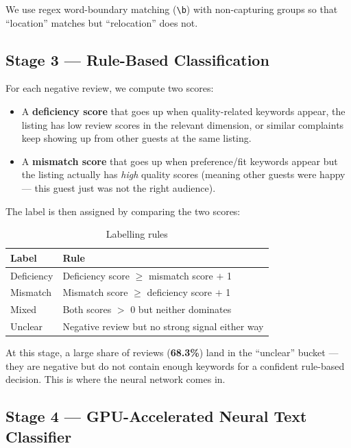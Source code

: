\documentclass[12pt,a4paper]{article}
\begin{document}
We use regex word-boundary matching (\verb|\b|) with non-capturing groups so that ``location'' matches but ``relocation'' does not.

\subsection{Stage 3 --- Rule-Based Classification}

For each negative review, we compute two scores:

\begin{itemize}[nosep]
    \item A \textbf{deficiency score} that goes up when quality-related keywords appear, the listing has low review scores in the relevant dimension, or similar complaints keep showing up from other guests at the same listing.
    \item A \textbf{mismatch score} that goes up when preference/fit keywords appear but the listing actually has \emph{high} quality scores (meaning other guests were happy --- this guest just was not the right audience).
\end{itemize}

The label is then assigned by comparing the two scores:

\begin{table}[H]
\centering
\caption{Labelling rules}
\begin{tabular}{lp{9cm}}
\toprule
\textbf{Label} & \textbf{Rule} \\
\midrule
Deficiency & Deficiency score $\geq$ mismatch score $+$ 1 \\
Mismatch   & Mismatch score $\geq$ deficiency score $+$ 1 \\
Mixed      & Both scores $>$ 0 but neither dominates \\
Unclear    & Negative review but no strong signal either way \\
\bottomrule
\end{tabular}
\end{table}

At this stage, a large share of reviews (\textbf{68.3\%}) land in the ``unclear'' bucket --- they are negative but do not contain enough keywords for a confident rule-based decision.
This is where the neural network comes in.

\subsection{Stage 4 --- GPU-Accelerated Neural Text Classifier}
\end{document}
